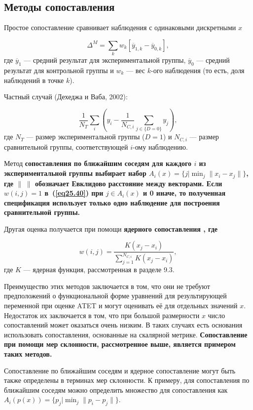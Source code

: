 \subsection*{Методы сопоставления}

Простое сопоставление сравнивает наблюдения с одинаковыми дискретными $x$

\begin{equation}
\label{eq25.41}
\Delta^M = \sum_k w_k [ \overline{y}_{1,k} - \overline{y}_{0,k} ],
\end{equation}
где $\overline{y}_{1}$ --- средний результат для экспериментальной группы, $\overline{y}_{0}$ --- средний результат для контрольной группы и $w_k$ --- вес $k$-ого наблюдения (то есть, доля наблюдений в точке $k$). 

Частный случай (Дехеджа и Ваба, 2002):

\begin{equation}
\label{eq25.42}
\frac{1}{N_T} \sum_i \left( y_i - \frac{1}{N_{C,i}} \sum_{j \in \{ D = 0\}} y_j \right) ,
\end{equation}
где $N_T$ --- размер экспериментальной группы ($D = 1$) и $N_{C,i}$ --- размер сравнительной группы, соответствующей $i$-ому наблюдению. 

Метод \bfseries сопоставления по ближайшим соседям \mdseries  для каждого $i$ из экспериментальной группы выбирает набор $A_i (x) = \{ j | \min_j \| x_i - x_j \| \}$, где $\| \; \|$  обозначает Евклидово расстояние между векторами. Если $w(i,j) = 1$ в~(\ref{eq25.40}) при $j \in A_i (x)$ и 0 иначе, то полученная спецификация использует только одно наблюдение для построения сравнительной группы. 

Другая оценка получается при помощи \bfseries ядерного сопоставления \mdseries, где

$$
w(i,j) = \frac{K (x_j - x_i)}{\sum_{j=1}^{N_{C,i}} K (x_j - x_i)},
$$
где $K$ --- ядерная функция, рассмотренная в разделе 9.3. 

Преимущество этих методов заключается в том, что они не требуют предположений о функциональной форме уравнений для результирующей переменной при оценке ATET и могут оценивать её для отдельных значений $x$. Недостаток их заключается в том, что при большой размерности $x$ число сопоставлений может оказаться очень низким. В таких случаях есть основания использовать сопоставления, основанные на скалярной метрике. \bfseries Сопоставление при помощи мер склонности, \mdseries рассмотренное выше, является примером таких методов. 

Сопоставление по ближайшим соседям и ядерное сопоставление могут быть также определены в терминах мер склонности. К примеру, для сопоставления по ближайшим соседям можно определить множество для сопоставления как $A_i (p(x)) = \{ p_j | \min_j \| p_i - p_j\| \}$. 


